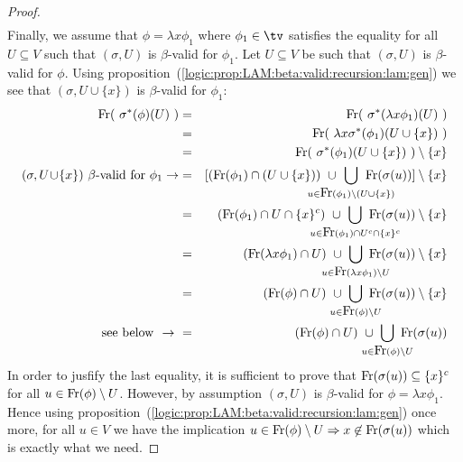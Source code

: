 \begin{proof}
\begin{eqnarray*}
    \end{eqnarray*}
    Finally, we assume that $\phi=\lambda x\phi_{1}$ where $\phi_{1}\in\tv$ 
    satisfies the equality for all $U\subseteq V$ such that $(\sigma,U)$ is
    $\beta$-valid for $\phi_{1}$. Let $U\subseteq V$ be such that $(\sigma,U)$
    is $\beta$-valid for $\phi$. Using
    proposition~(\ref{logic:prop:LAM:beta:valid:recursion:lam:gen}) we see 
    that $(\sigma,U\cup\{x\})$ is $\beta$-valid for $\phi_{1}$: 
    \begin{eqnarray*}\free(\ \sigma^{*}(\phi)(U)\ )
        &=&\free(\ \sigma^{*}(\lambda x\phi_{1})(U)\ )\\
        &=&\free(\ \lambda x\sigma^{*}(\phi_{1})(U\cup\{x\})\ )\\
        &=&\free(\ \sigma^{*}(\phi_{1})(U\cup\{x\})\ )\setminus\{x\}\\
        \mbox{$(\sigma,U\!\cup\!\{x\})$ $\beta$-valid for 
            $\phi_{1}\rightarrow$}
        &=& [(\free(\phi_{1})\cap(U\cup\{x\}))
        \ \cup\ 
        \!\!\!\!\!\!\!\!\!\!\!\!\!\!\!\!\!
        \bigcup_{u\in\free(\phi_{1})\setminus(U\cup\{x\})}
        \!\!\!\!\!\!\!\!\!\!\!\!\!\!\!
        \free(\sigma(u))
        ]\setminus\{x\}\\
        &=&(\free(\phi_{1})\cap U\cap \{x\}^{c})
        \ \cup\ 
        \!\!\!\!\!\!\!\!\!\!\!\!\!\!\!\!\!\!
        \bigcup_{u\in\free(\phi_{1})\cap U^{c}\cap\{x\}^{c}}
        \!\!\!\!\!\!\!\!\!\!\!\!\!\!\!\!
        \free(\sigma(u))\setminus\{x\}\\
        &=&(\free(\lambda x\phi_{1})\cap U)
        \ \cup\ 
        \!\!\!\!\!\!\!\!\!\!\!\!\!
        \bigcup_{u\in\free(\lambda x\phi_{1})\setminus U}
        \!\!\!\!\!\!\!\!\!\!\!
        \free(\sigma(u))\setminus\{x\}\\
        &=&(\free(\phi)\cap U)
        \ \cup\ 
        \!\!\!\!\!\!\!\!\!
        \bigcup_{u\in\free(\phi)\setminus U} 
        \!\!\!\!\!\!\!
        \free(\sigma(u))\setminus\{x\}\\
        \mbox{see below $\ \rightarrow\ $}
        &=&(\free(\phi)\cap U)
        \ \cup\ 
        \!\!\!\!\!\!\!\!\!
        \bigcup_{u\in\free(\phi)\setminus U}
        \!\!\!\!\!\!\!
        \free(\sigma(u))
    \end{eqnarray*}
    In order to jusfify the last equality, it is sufficient to prove that 
    $\mbox{\rm Fr}(\sigma(u))\subseteq\{x\}^{c}$ for all $u\in\mbox{\rm Fr}(\phi)\setminus U$.
    However, by assumption $(\sigma,U)$ is $\beta$-valid for $\phi=\lambda
    x\phi_{1}$. Hence using 
    proposition~(\ref{logic:prop:LAM:beta:valid:recursion:lam:gen}) once more,
    for all $u\in V$ we have the implication $u\in\mbox{\rm Fr}(\phi)\setminus 
    U\Rightarrow x\not\in \mbox{\rm Fr}(\sigma(u))$ which is exactly what we need.
\end{proof}

